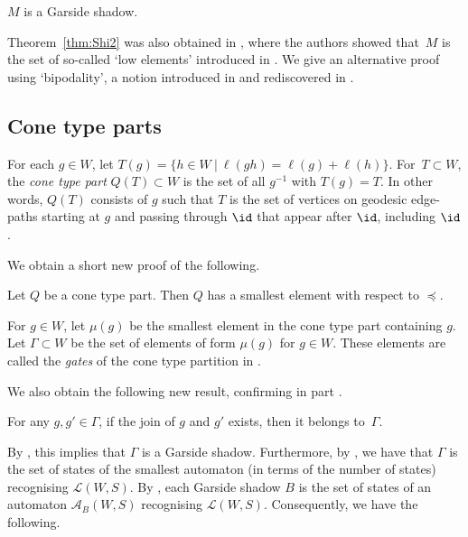 \begin{thm}
	\label{thm:Shi2}
	$M$ is a Garside shadow.
\end{thm}

Theorem~\ref{thm:Shi2} was also obtained in \cite[Thm.~1.1(2)]{DHFM}, where the authors showed that~$M$ is the set of so-called `low elements' introduced in \cite{DH}. We give an alternative  proof using `bipodality', a notion introduced in \cite{DH} and rediscovered in \cite{OP}.

\subsection*{Cone type parts} 

For each $g\in W$, let $T(g)=\{h\in W \ | \ \ell(gh)=\ell(g)+\ell(h)\}$. For~$T\subset W$, the \emph{cone type part} $Q(T)\subset W$ is the set of all $g^{-1}$ with $T(g)=T$. In other words, $Q(T)$ consists of $g$ such that $T$ is the set of vertices on geodesic edge-paths starting at $g$ and passing through $\id$ that appear after $\id$, including $\id$. 

We obtain a short new proof of the following.

\begin{thm} 
	\label{thm:conetype}
	{\cite[Thm.~1]{Parkinson-Yau_2022}} Let $Q$ be a cone type part. Then $Q$ has a smallest element with respect to $\preceq$.
\end{thm}

For $g\in W$, let $\mu(g)$ be the smallest element in the cone type part containing $g$. Let $\Gamma\subset W$ be the set of elements of form $\mu(g)$ for $g\in W$. These elements are called the \textit{gates} of the cone type partition in \cite{Parkinson-Yau_2022}. 

We also obtain the following new result, confirming in part {\cite[Conj.~1]{Parkinson-Yau_2022}}.

\begin{thm} 
	\label{thm:conetype2}
	For any $g,g'\in \Gamma$, if the join of $g$ and $g'$ exists, then it belongs to~$\Gamma$. 
\end{thm}

By \cite[Prop~4.27(i)]{Parkinson-Yau_2022}, this implies that $\Gamma$ is a Garside shadow. Furthermore, by \cite[Cor.~4]{Parkinson-Yau_2022}, we have that $\Gamma$ is the set of states of the smallest automaton (in terms of the number of states) recognising $\mathcal{L}(W,S)$. By \cite[Thm.~1.2]{HNW}, each Garside shadow $B$ is the set of states of an automaton $\mathcal A_B(W,S)$ recognising $\mathcal{L}(W,S)$. Consequently, we have the following.

